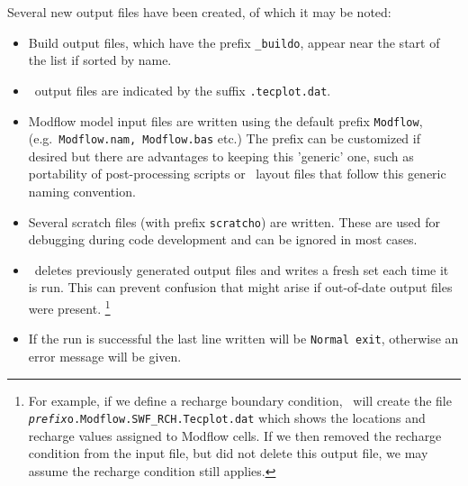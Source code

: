 Several new output files have been created, of which it may be noted:
\begin{itemize}
    \item Build output files, which have the prefix \texttt{\_buildo}, appear near the start of the list if sorted by name.
    \item \tecplot\ output files are indicated by the suffix \texttt{.tecplot.dat}.
    \item Modflow model input files are written using the default prefix \texttt{Modflow}, (e.g.\ \texttt{Modflow.nam, Modflow.bas} etc.)  The prefix can be customized if desired but there are advantages to keeping this 'generic' one, such as portability of post-processing scripts or \tecplot\ layout files that follow this generic naming convention.
    \item Several scratch files (with prefix \texttt{scratcho}) are written. These are used for debugging during code development and can be ignored in most cases.
    \item \mut\ deletes previously generated output files and writes a fresh set each time it is run.  This can prevent confusion that might arise if out-of-date output files were present.
        \footnote{For example, if we define a recharge boundary condition, \mut\ will create the file \texttt{\textit{prefix}o.Modflow.SWF\_RCH.Tecplot.dat} which shows the locations and recharge values assigned to Modflow cells.  If we then removed the recharge condition from the input file, but did not delete this output file, we may assume the recharge condition still applies.}
    \item If the run is successful the last line written will be \texttt{Normal exit}, otherwise an error message will be given.
\end{itemize}

